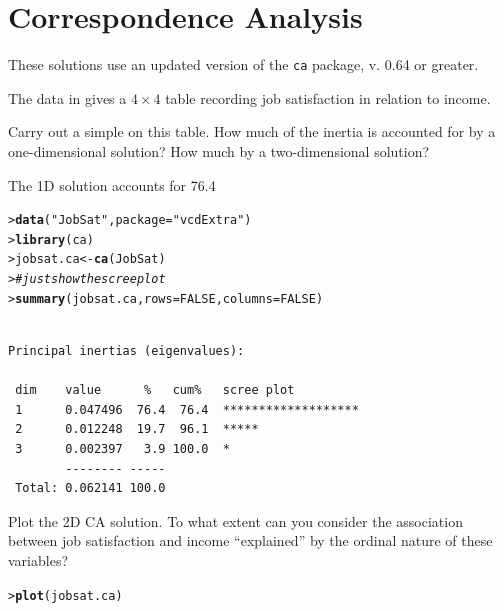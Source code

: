 \documentclass[10pt]{report}\usepackage[]{graphicx}\usepackage[]{color}
\makeatletter
\newcommand{\hlnum}[1]{\textcolor[rgb]{0.686,0.059,0.569}{#1}}%
\newcommand{\hlstr}[1]{\textcolor[rgb]{0.192,0.494,0.8}{#1}}%
\newcommand{\hlcom}[1]{\textcolor[rgb]{0.678,0.584,0.686}{\textit{#1}}}%
\newcommand{\hlstd}[1]{\textcolor[rgb]{0.345,0.345,0.345}{#1}}%
\newcommand{\hlkwb}[1]{\textcolor[rgb]{0.69,0.353,0.396}{#1}}%
\newcommand{\hlkwc}[1]{\textcolor[rgb]{0.333,0.667,0.333}{#1}}%
\newcommand{\hlkwd}[1]{\textcolor[rgb]{0.737,0.353,0.396}{\textbf{#1}}}%
\newenvironment{kframe}{%
 \def\at@end@of@kframe{}%
 \ifinner\ifhmode%
  \def\at@end@of@kframe{\end{minipage}}%
  \begin{minipage}{\columnwidth}%
 \fi\fi%
 \def\FrameCommand##1{\hskip\@totalleftmargin \hskip-\fboxsep
 \colorbox{shadecolor}{##1}\hskip-\fboxsep
     \hskip-\linewidth \hskip-\@totalleftmargin \hskip\columnwidth}%
 \MakeFramed {\advance\hsize-\width
   \@totalleftmargin\z@ \linewidth\hsize
   \@setminipage}}%
 {\par\unskip\endMakeFramed%
 \at@end@of@kframe}
\newenvironment{knitrout}{}{} %
\renewenvironment{knitrout}{\small\renewcommand{\baselinestretch}{.85}}{} %
\makeatother
\begin{document}
\clearpage
\chapter{Correspondence Analysis}\label{ch:corresp}

These solutions use an updated version of the \texttt{ca} package, v. 0.64 or greater.

\begin{Exercises}

  \exercise The  data in  gives a $4 \times 4$ table recording job satisfaction
  in relation to income.
  \begin{enumerate*}
    \item  Carry out a simple \ca on this table.  How much of the inertia is accounted for by a
    one-dimensional solution?  How much by a two-dimensional solution?
    \begin{ans}
The 1D solution accounts for 76.4%
\begin{knitrout}\footnotesize
{}\color{fgcolor}\begin{kframe}
\begin{alltt}
\hlstd{> }\hlkwd{data}\hlstd{(}\hlstr{"JobSat"}\hlstd{,} \hlkwc{package}\hlstd{=}\hlstr{"vcdExtra"}\hlstd{)}
\hlstd{> }\hlkwd{library}\hlstd{(ca)}
\hlstd{> }\hlstd{jobsat.ca} \hlkwb{<-} \hlkwd{ca}\hlstd{(JobSat)}
\hlstd{> }    \hlcom{# just show the scree plot}
\hlstd{> }\hlkwd{summary}\hlstd{(jobsat.ca,} \hlkwc{rows}\hlstd{=}\hlnum{FALSE}\hlstd{,} \hlkwc{columns}\hlstd{=}\hlnum{FALSE}\hlstd{)}
\end{alltt}
\begin{verbatim}

Principal inertias (eigenvalues):

 dim    value      %   cum%   scree plot               
 1      0.047496  76.4  76.4  *******************      
 2      0.012248  19.7  96.1  *****                    
 3      0.002397   3.9 100.0  *                        
        -------- -----                                 
 Total: 0.062141 100.0                                 
\end{verbatim}
\end{kframe}
\end{knitrout}
    \end{ans}
    
    \item Plot the 2D CA solution.  To what extent can you consider the association between
    job satisfaction and income ``explained'' by the ordinal nature of these variables?
    \begin{ans}
\begin{knitrout}\footnotesize
{}\color{fgcolor}\begin{kframe}
\begin{alltt}
\hlstd{> }\hlkwd{plot}\hlstd{(jobsat.ca)}
\end{alltt}
\end{kframe}


\end{knitrout}
\end{ans}
\end{enumerate*}
\end{Exercises}
\end{document}
